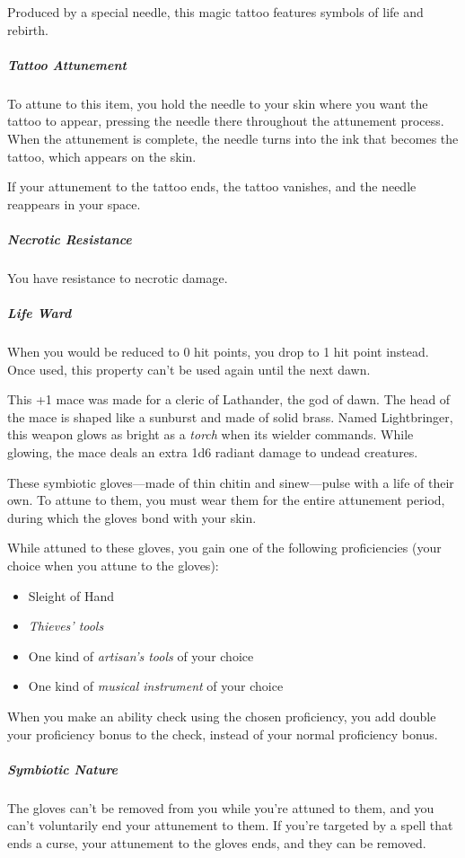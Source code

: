 \documentclass[10pt,a4paper,twoside,bg=print,twocolumn,openany,nodeprecatedcode]{dndbook}
\begin{document}
Produced by a special needle, this magic tattoo features symbols of life and rebirth.

\subparagraph{Tattoo Attunement}
To attune to this item, you hold the needle to your skin where you want the tattoo to appear, pressing the needle there throughout the attunement process. When the attunement is complete, the needle turns into the ink that becomes the tattoo, which appears on the skin.

If your attunement to the tattoo ends, the tattoo vanishes, and the needle reappears in your space.

\subparagraph{Necrotic Resistance}
You have resistance to necrotic damage.

\subparagraph{Life Ward}
When you would be reduced to 0 hit points, you drop to 1 hit point instead. Once used, this property can't be used again until the next dawn.

This +1 mace was made for a cleric of Lathander, the god of dawn. The head of the mace is shaped like a sunburst and made of solid brass. Named Lightbringer, this weapon glows as bright as a \textit{torch} when its wielder commands. While glowing, the mace deals an extra 1d6 radiant damage to undead creatures.

These symbiotic gloves—made of thin chitin and sinew—pulse with a life of their own. To attune to them, you must wear them for the entire attunement period, during which the gloves bond with your skin.

While attuned to these gloves, you gain one of the following proficiencies (your choice when you attune to the gloves):


\begin{itemize}
\item Sleight of Hand
\item \textit{Thieves' tools}
\item One kind of \textit{artisan's tools} of your choice
\item One kind of \textit{musical instrument} of your choice
\end{itemize}

When you make an ability check using the chosen proficiency, you add double your proficiency bonus to the check, instead of your normal proficiency bonus.

\subparagraph{Symbiotic Nature}
The gloves can't be removed from you while you're attuned to them, and you can't voluntarily end your attunement to them. If you're targeted by a spell that ends a curse, your attunement to the gloves ends, and they can be removed.
\end{document}
